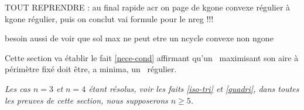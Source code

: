 TOUT REPRENDRE : 
au final rapide acr on page de kgone convexe régulier à kgone régulier, puis on conclut vai formule pour le nreg !!!

besoin aussi de voir que sol max ne peut etre un ncycle convexe non ngone




Cette section va établir le fait \ref{nece-cond} affirmant qu'un \ngone\ maximisant son aire à périmètre fixé doit être, a minima, un \ngone\ régulier.


\begin{tcolorbox}
	\itshape\small
	Les cas $n = 3$ et $n = 4$ étant résolus, voir les faits \ref{iso-tri} et \ref{quadri}, dans toutes les preuves de cette section, nous supposerons $n \geq 5 $.
\end{tcolorbox}





